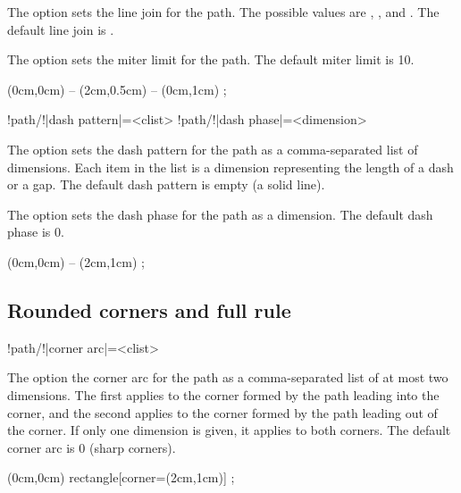 \documentclass[a4paper]{article}
\begin{document}
{{The option  sets the line join for the path. The possible values are , , and . The default line join is .

The option  sets the miter limit for the path. The default miter limit is \num{10}.

\begin{codeexamplecolumns}
\begin{qdraw}[line width={5pt}]
  \stroke[line join={bevel}]
    (0cm,0cm) -- (2cm,0.5cm)
    -- (0cm,1cm) ;
\end{qdraw}
\end{codeexamplecolumns}

\begin{macrodef}
!path/!|dash pattern|={<clist>}
!path/!|dash phase|={<dimension>}
\end{macrodef}
The option  sets the dash pattern for the path as a comma-separated list of dimensions. Each item in the list is a dimension representing the length of a dash or a gap. The default dash pattern is empty (a solid line).

The option  sets the dash phase for the path as a dimension. The default dash phase is \qty{0}{\point}.

\begin{codeexamplecolumns}
\begin{qdraw}
  \stroke[
    dash pattern={10pt,5pt},
    dash phase={2.5pt}
  ] (0cm,0cm) -- (2cm,1cm) ;
\end{qdraw}
\end{codeexamplecolumns}

\subsection{Rounded corners and full rule}

\begin{macrodef}
!path/!|corner arc|={<clist>}
\end{macrodef}
The option  the corner arc for the path as a comma-separated list of at most two dimensions. The first applies to the corner formed by the path leading into the corner, and the second applies to the corner formed by the path leading out of the corner. If only one dimension is given, it applies to both corners. The default corner arc is \qty{0}{\point} (sharp corners).

\begin{codeexamplecolumns}
\begin{qdraw}
  \stroke[corner arc={5pt}] (0cm,0cm)
    rectangle[corner={(2cm,1cm)}] ;
\end{qdraw}
\end{codeexamplecolumns}

}}
\end{document}
